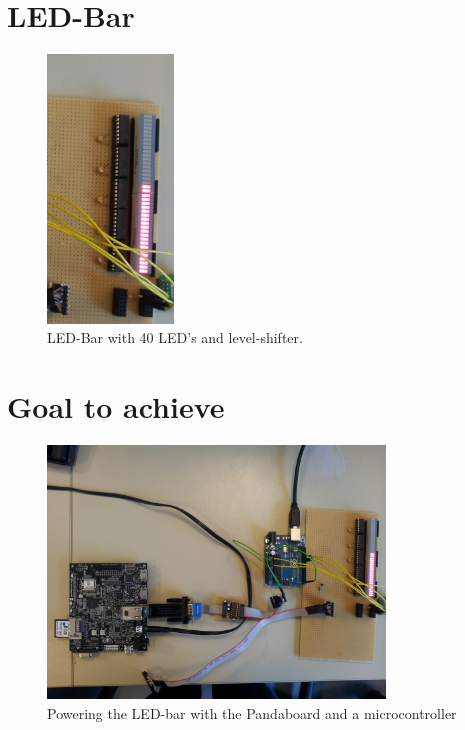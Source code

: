 \section{LED-Bar}
\begin{figure}[H]
   \centering
   \includegraphics[width=0.3\textwidth]{img/LED-Bar.png}%
   \caption{LED-Bar with 40 LED's and level-shifter.}
   \label{fig:ledBar}%
\end{figure}

\section{Goal to achieve}
\begin{figure}[H]
   \centering
   \includegraphics[width=0.8\textwidth]{img/Panda_and_LED_Bar.jpg}%
   \caption{Powering the LED-bar with the Pandaboard and a microcontroller}
   \label{fig:completeProject}%
\end{figure}